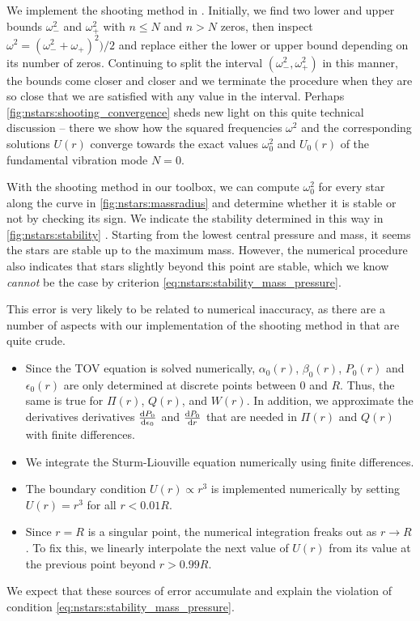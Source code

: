 We implement the shooting method in .
Initially, we find two lower and upper bounds $\omega_-^2$ and $\omega_+^2$ with $n \leq N$ and $n > N$ zeros, then inspect $\omega^2 = (\omega_-^2 + \omega_+)^2) / 2$ and replace either the lower or upper bound depending on its number of zeros.
Continuing to split the interval $(\omega_-^2, \omega_+^2)$ in this manner, the bounds come closer and closer and we terminate the procedure when they are so close that we are satisfied with any value in the interval.
Perhaps \cref{fig:nstars:shooting_convergence} sheds new light on this quite technical discussion -- there we show how the squared frequencies $\omega^2$ and the corresponding solutions $U(r)$ converge towards the exact values $\omega_0^2$ and $U_0(r)$ of the fundamental vibration mode $N=0$.

With the shooting method in our toolbox, we can compute $\omega_0^2$ for every star along the curve in \cref{fig:nstars:massradius} and determine whether it is stable or not by checking its sign.
We indicate the stability determined in this way in \cref{fig:nstars:stability} .
Starting from the lowest central pressure and mass, it seems the stars are stable up to the maximum mass.
However, the numerical procedure also indicates that stars slightly beyond this point are stable, which we know \emph{cannot} be the case by criterion \eqref{eq:nstars:stability_mass_pressure}.

This error is very likely to be related to numerical inaccuracy, as there are a number of aspects with our implementation of the shooting method in  that are quite crude.
\begin{itemize}
\item Since the TOV equation is solved numerically, $\alpha_0(r)$, $\beta_0(r)$, $P_0(r)$ and $\epsilon_0(r)$ are only determined at discrete points between $0$ and $R$.
      Thus, the same is true for $\Pi(r)$, $Q(r)$, and $W(r)$.
      In addition, we approximate the derivatives derivatives $\odv{P_0}{\epsilon_0}$ and $\odv{P_0}{r}$ that are needed in $\Pi(r)$ and $Q(r)$ with finite differences.
\item We integrate the Sturm-Liouville equation numerically using finite differences.
\item The boundary condition $U(r) \propto r^3$ is implemented numerically by setting $U(r) = r^3$ for all $r < 0.01 R$.
\item Since $r=R$ is a singular point, the numerical integration freaks out as $r \rightarrow R$.
      To fix this, we linearly interpolate the next value of $U(r)$ from its value at the previous point beyond $r > 0.99 R$.
\end{itemize}
We expect that these sources of error accumulate and explain the violation of condition \eqref{eq:nstars:stability_mass_pressure}.

